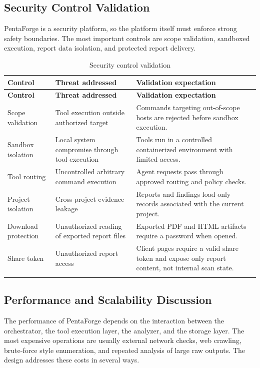 \documentclass[12pt,a4paper]{report}
\begin{document}
\subsection{Security Control Validation}

PentaForge is a security platform, so the platform itself must enforce strong safety
boundaries. The most important controls are scope validation, sandboxed execution,
report data isolation, and protected report delivery.

\begin{longtable}{|p{}|p{}|p{}|}
\hline
\textbf{Control} & \textbf{Threat addressed} & \textbf{Validation expectation} \\
\hline
\endfirsthead
\hline
\textbf{Control} & \textbf{Threat addressed} & \textbf{Validation expectation} \\
\hline
\endhead
Scope validation & Tool execution outside authorized target & Commands targeting
out-of-scope hosts are rejected before sandbox execution. \\
\hline
Sandbox isolation & Local system compromise through tool execution & Tools run in a
controlled containerized environment with limited access. \\
\hline
Tool routing & Uncontrolled arbitrary command execution & Agent requests pass through
approved routing and policy checks. \\
\hline
Project isolation & Cross-project evidence leakage & Reports and findings load only
records associated with the current project. \\
\hline
Download protection & Unauthorized reading of exported report files & Exported PDF and
HTML artifacts require a password when opened. \\
\hline
Share token & Unauthorized report access & Client pages require a valid share token
and expose only report content, not internal scan state. \\
\hline
\caption{Security control validation}
\label{tab:security_control_validation}
\end{longtable}

\subsection{Performance and Scalability Discussion}

The performance of PentaForge depends on the interaction between the orchestrator, the
tool execution layer, the analyzer, and the storage layer. The most expensive
operations are usually external network checks, web crawling, brute-force style
enumeration, and repeated analysis of large raw outputs. The design addresses these
costs in several ways.
\end{document}
